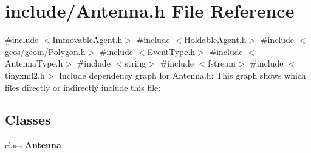 \section{include/\+Antenna.h File Reference}
\label{_antenna_8h}
{\ttfamily \#include $<$Immovable\+Agent.\+h$>$}\newline
{\ttfamily \#include $<$Holdable\+Agent.\+h$>$}\newline
{\ttfamily \#include $<$geos/geom/\+Polygon.\+h$>$}\newline
{\ttfamily \#include $<$Event\+Type.\+h$>$}\newline
{\ttfamily \#include $<$Antenna\+Type.\+h$>$}\newline
{\ttfamily \#include $<$string$>$}\newline
{\ttfamily \#include $<$fstream$>$}\newline
{\ttfamily \#include $<$tinyxml2.\+h$>$}\newline
Include dependency graph for Antenna.\+h\+:
This graph shows which files directly or indirectly include this file\+:
\subsection*{Classes}
\begin{DoxyCompactItemize}
\item 
class \textbf{ Antenna}
\end{DoxyCompactItemize}
